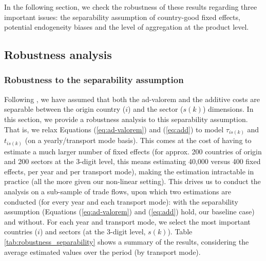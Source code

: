 \documentclass[a4paper,11pt]{article}
\begin{document}
In the following section, we check the robustness of these results regarding three important issues: the separability assumption of country-good fixed effects, potential endogeneity biases and the level of aggregation at the product level.

\subsection{Robustness analysis \label{sec:robustness}}


\subsubsection{Robustness to the separability assumption}\label{sec:rob_sep}
Following \cite{Irrazabal_2015}, we have assumed that both the ad-valorem and the additive costs are separable between the origin country ($i$) and the sector ($s(k)$) dimensions. In this section, we provide a robustness analysis to this separability assumption. That is, we relax Equations (\ref{eq:ad-valorem}) and (\ref{eq:add}) to model $\tau_{is(k)}$ and $t_{is(k)}$ (on a yearly/transport mode basis). This comes at the cost of having to estimate a much larger number of fixed effects (for approx. 200 countries of origin and 200 sectors at the 3-digit level, this means estimating 40,000 versus 400 fixed effects, per year and per transport mode), making the estimation intractable in practice (all the more given our non-linear setting).
This drives us to conduct the analysis on a sub-sample of trade flows, upon which two estimations are conducted (for every year and each transport mode): with the separability assumption (Equations (\ref{eq:ad-valorem}) and (\ref{eq:add}) hold, our baseline case) and without.
For each year and transport mode, we select the most important countries ($i$) and sectors (at the 3-digit level, $s(k)$). Table \ref{tab:robustness_separability} shows a summary of the results, considering the average estimated values over the period (by transport mode).
%
\end{document}

